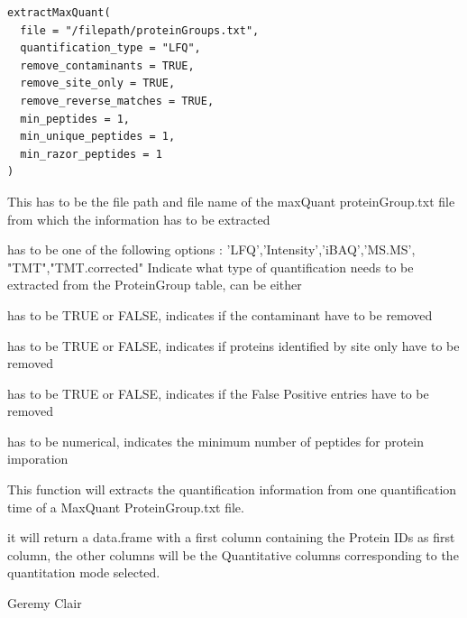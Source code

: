 \documentclass[a4paper]{book}
\begin{document}
%
\begin{Usage}
\begin{verbatim}
extractMaxQuant(
  file = "/filepath/proteinGroups.txt",
  quantification_type = "LFQ",
  remove_contaminants = TRUE,
  remove_site_only = TRUE,
  remove_reverse_matches = TRUE,
  min_peptides = 1,
  min_unique_peptides = 1,
  min_razor_peptides = 1
)
\end{verbatim}
\end{Usage}
%
\begin{Arguments}
\begin{ldescription}
\item[\code{file}] This has to be the file path and file name of the maxQuant proteinGroup.txt file from which the information has to be extracted

\item[\code{quantification\_type}] has to be one of the following options : 'LFQ','Intensity','iBAQ','MS.MS', "TMT","TMT.corrected" Indicate what type of quantification needs to be extracted from the ProteinGroup table, can be either

\item[\code{remove\_contaminants}] has to be TRUE or FALSE, indicates if the contaminant have to be removed

\item[\code{remove\_site\_only}] has to be TRUE or FALSE, indicates if proteins identified by site only have to be removed

\item[\code{remove\_reverse\_matches}] has to be TRUE or FALSE, indicates if the False Positive entries have to be removed

\item[\code{min\_peptides}] has to be numerical, indicates the minimum number of peptides for protein imporation
\end{ldescription}
\end{Arguments}
%
\begin{Details}
This function will extracts the quantification information from one quantification time of a MaxQuant ProteinGroup.txt file.
\end{Details}
%
\begin{Value}
it will return a data.frame with a first column containing the Protein IDs as first column, the other columns will be the Quantitative columns corresponding to the quantitation mode selected.
\end{Value}
%
\begin{Author}
Geremy Clair
\end{Author}
\end{document}
